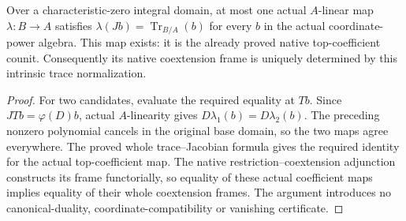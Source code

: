 \begin{theorem}\label{thm:kn-nadel-polynomial-trace-uniqueness}
\leanok
{}
Over a characteristic-zero integral domain, at most one actual
$A$-linear map $\lambda:B\to A$ satisfies
$\lambda(Jb)=\operatorname{Tr}_{B/A}(b)$ for every $b$ in the actual
coordinate-power algebra.  This map exists: it is the already proved
native top-coefficient counit.  Consequently its native coextension frame
is uniquely determined by this intrinsic trace normalization.
\end{theorem}
\begin{proof}
For two candidates, evaluate the required equality at $Tb$.  Since
$JTb=\varphi(D)b$, actual $A$-linearity gives
$D\lambda_1(b)=D\lambda_2(b)$.  The preceding nonzero polynomial
cancels in the original base domain, so the two maps agree everywhere.
The proved whole trace--Jacobian formula gives the required identity for
the actual top-coefficient map.  The native restriction--coextension
adjunction constructs its frame functorially, so equality of these actual
coefficient maps implies equality of their whole coextension frames.
The argument introduces no canonical-duality, coordinate-compatibility or
vanishing certificate.
\end{proof}
